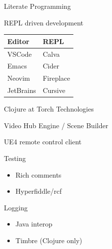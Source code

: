 \documentclass[bigger]{beamer}
\begin{document}
\begin{frame}[label={sec:orgb41545b}]{Literate Programming}
\end{frame}

\begin{frame}[label={sec:orgf4c68c2}]{REPL driven development}
\begin{center}
\begin{tabular}{ll}
Editor & REPL\\[0pt]
\hline
VSCode & Calva\\[0pt]
Emacs & Cider\\[0pt]
Neovim & Fireplace\\[0pt]
JetBrains & Cursive\\[0pt]
\end{tabular}
\end{center}
\end{frame}

\begin{frame}[label={sec:orgecf684c}]{Clojure at Torch Technologies}
\begin{block}{Video Hub Engine / Scene Builder}
\end{block}
\begin{block}{UE4 remote control client}
\end{block}
\end{frame}

\begin{frame}[label={sec:org27934ae}]{Testing}
\begin{itemize}
\item Rich comments
\item Hyperfiddle/rcf
\end{itemize}
\end{frame}

\begin{frame}[label={sec:org4056f2b}]{Logging}
\begin{itemize}
\item Java interop
\item Timbre (Clojure only)
\end{itemize}
\end{frame}
\end{document}

